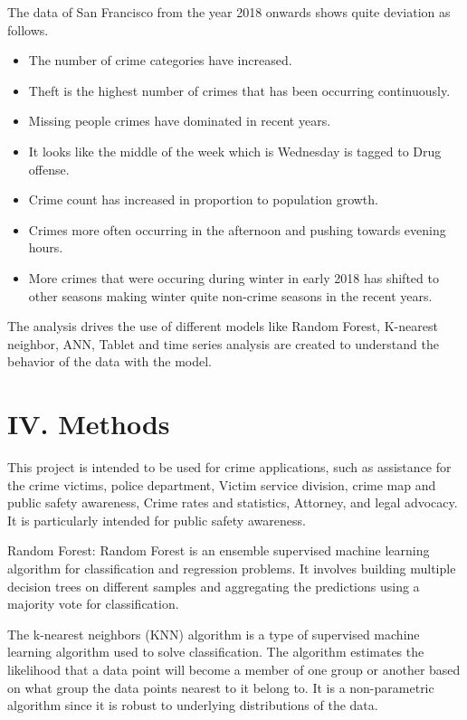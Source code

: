 \documentclass[11 pt,conference,final,]{IEEEtran}
\providecommand{\tightlist}{%
  \setlength{\itemsep}{0pt}\setlength{\parskip}{0pt}}
\begin{document}
The data of San Francisco from the year 2018 onwards shows quite
deviation as follows.

\begin{itemize}
\tightlist
\item
  The number of crime categories have increased.
\item
  Theft is the highest number of crimes that has been occurring
  continuously.
\item
  Missing people crimes have dominated in recent years.
\item
  It looks like the middle of the week which is Wednesday is tagged to
  Drug offense.
\item
  Crime count has increased in proportion to population growth.
\item
  Crimes more often occurring in the afternoon and pushing towards
  evening hours.
\item
  More crimes that were occuring during winter in early 2018 has shifted
  to other seasons making winter quite non-crime seasons in the recent
  years.
\end{itemize}

The analysis drives the use of different models like Random Forest,
K-nearest neighbor, ANN, Tablet and time series analysis are created to
understand the behavior of the data with the model.

\section{IV. Methods}\label{iv.-methods}

This project is intended to be used for crime applications, such as
assistance for the crime victims, police department, Victim service
division, crime map and public safety awareness, Crime rates and
statistics, Attorney, and legal advocacy. It is particularly intended
for public safety awareness.

Random Forest: Random Forest is an ensemble supervised machine learning
algorithm for classification and regression problems. It involves
building multiple decision trees on different samples and aggregating
the predictions using a majority vote for classification.

The k-nearest neighbors (KNN) algorithm is a type of supervised machine
learning algorithm used to solve classification. The algorithm estimates
the likelihood that a data point will become a member of one group or
another based on what group the data points nearest to it belong to. It
is a non-parametric algorithm since it is robust to underlying
distributions of the data.
\end{document}
